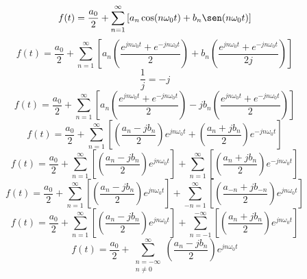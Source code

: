 \begin{equation*}
    f(t)=\frac{a_0}{2}+
    \sum_{n=1}^{\infty}\left[
        a_n\cos(n\omega_0 t)+
        b_n\sen(n\omega_0 t)
    \right]
\end{equation*}
\begin{equation*}
    f(t)=\frac{a_0}{2}+
    \sum_{n=1}^{\infty}\left[
        a_n\left(
            \frac{e^{jn\omega_0 t}+e^{-jn\omega_0 t}
            }{2}
        \right)+
        b_n\left(
            \frac{e^{jn\omega_0 t}+e^{-jn\omega_0 t}
            }{2j}
        \right)
    \right]
\end{equation*}
\begin{equation*}
    \frac{1}{j}=-j
\end{equation*}
\begin{equation*}
    f(t)=\frac{a_0}{2}+
    \sum_{n=1}^{\infty}\left[
        a_n\left(
            \frac{e^{jn\omega_0 t}+e^{-jn\omega_0 t}
            }{2}
        \right)-
        jb_n\left(
            \frac{e^{jn\omega_0 t}+e^{-jn\omega_0 t}
            }{2}
        \right)
    \right]
\end{equation*}
\begin{equation*}
    f(t)=\frac{a_0}{2}+
    \sum_{n=1}^{\infty}\left[
        \left(\frac{a_n-jb_n}{2}\right)e^{jn\omega_0 t}+
        \left(\frac{a_n+jb_n}{2}\right)e^{-jn\omega_0 t}
    \right]
\end{equation*}
\begin{equation*}
    f(t)=\frac{a_0}{2}+
    \sum_{n=1}^{\infty}\left[
        \left(\frac{a_n-jb_n}{2}\right)e^{jn\omega_0 t}
    \right]+
    \sum_{n=1}^{\infty}\left[
        \left(\frac{a_n+jb_n}{2}\right)e^{-jn\omega_0 t}
    \right]
\end{equation*}
\begin{equation*}
    f(t)=\frac{a_0}{2}+
    \sum_{n=1}^{\infty}\left[
        \left(\frac{a_n-jb_n}{2}\right)e^{jn\omega_0 t}
    \right]+
    \sum_{-n=1}^{\infty}\left[
        \left(\frac{a_{-n}+jb_{-n}}{2}\right)e^{jn\omega_0 t}
    \right]
\end{equation*}
\begin{equation*}
    f(t)=\frac{a_0}{2}+
    \sum_{n=1}^{\infty}\left[
        \left(\frac{a_n-jb_n}{2}\right)e^{jn\omega_0 t}
    \right]+
    \sum_{n=-1}^{-\infty}\left[
        \left(\frac{a_n+jb_n}{2}\right)e^{jn\omega_0 t}
    \right]
\end{equation*}
\begin{equation*}
    f(t)=\frac{a_0}{2}+
    \sum_{\substack{n=-\infty\\n\neq0}}^{\infty}\left(\frac{a_n-jb_n}{2}\right)e^{jn\omega_0 t}
\end{equation*}

